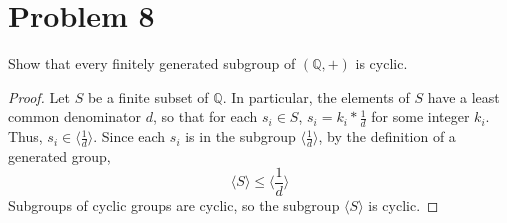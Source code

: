 \documentclass[paper=a4, fontsize=11pt]{scrartcl} %
\numberwithin{equation}{section} %
\numberwithin{figure}{section} %
\numberwithin{table}{section} %
\begin{document}
\section*{Problem 8}
Show that every finitely generated subgroup of $(\mathbb{Q},+)$ is cyclic.
\\
\begin{proof}
Let $S$ be a finite subset of $\mathbb{Q}$. In particular, the elements of $S$ have a
least common denominator $d$, so that for each $s_i\in S$, $s_i = k_i * \frac{1}{d}$ for
some integer $k_i$. Thus, $s_i\in\langle\frac{1}{d}\rangle$. 
Since each $s_i$ is in the subgroup $\langle\frac{1}{d}\rangle$, by the definition of a generated group,
\[
\langle S\rangle\leq\langle\frac{1}{d}\rangle
\]
Subgroups of cyclic groups are cyclic, so the subgroup $\langle S \rangle$ is cyclic.
\end{proof}
\end{document}
